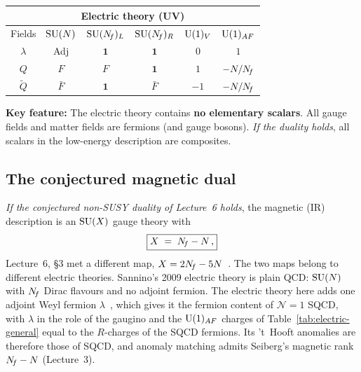 \documentclass[11pt,a4paper]{article}
\begin{document}
\begin{center}
\renewcommand{\arraystretch}{1.3}
\begin{tabular}{c c c c c c}
\toprule
\multicolumn{6}{c}{\textbf{Electric theory (UV)}} \\
\midrule
Fields & $\mathrm{SU}(N)$ & $\mathrm{SU}(N_{\!f})_L$ & $\mathrm{SU}(N_{\!f})_R$ & $\mathrm{U}(1)_V$ & $\mathrm{U}(1)_{AF}$ \\
\midrule
$\lambda$ & Adj & $\mathbf{1}$ & $\mathbf{1}$ & $0$ & $1$ \\
$Q$       & $F$ & $F$ & $\mathbf{1}$ & $1$  & $-N/N_{\!f}$ \\
$\widetilde{Q}$ & $\bar{F}$ & $\mathbf{1}$ & $\bar{F}$ & $-1$ & $-N/N_{\!f}$ \\
\bottomrule
\end{tabular}
\label{tab:electric-general}
\end{center}

\medskip

\noindent\textbf{Key feature:} The electric theory contains
\textbf{no elementary scalars}.  All gauge fields and matter fields are
fermions (and gauge bosons).  \emph{If the duality holds}, all scalars
in the low-energy description are composites.

\subsection{The conjectured magnetic dual}

\emph{If the conjectured non-SUSY duality of Lecture~6 holds}, the
magnetic (IR) description is an $\mathrm{SU}(X)$ gauge theory with~\cite{CacciapagliaSannino2024}
\begin{equation}\label{eq:duality-map}
  \boxed{X \;=\; N_{\!f} - N\,,}
\end{equation}
Lecture~6, \S3 met a different map, $X = 2N_{\!f} - 5N$~\cite{Sannino2009}.
The two maps belong to different electric theories.  Sannino's 2009
electric theory is plain QCD: $\mathrm{SU}(N)$ with $N_{\!f}$ Dirac flavours and
no adjoint fermion.  The electric theory here adds one adjoint Weyl
fermion $\lambda$~\cite{MNPS2011}, which gives it the fermion content
of $\mathcal{N}=1$ SQCD, with $\lambda$ in the role of the gaugino and
the $\mathrm{U}(1)_{AF}$ charges of Table~\ref{tab:electric-general} equal to
the $R$-charges of the SQCD fermions.  Its 't~Hooft anomalies are
therefore those of SQCD, and anomaly matching admits Seiberg's magnetic
rank $N_{\!f} - N$ (Lecture~3).
\end{document}
